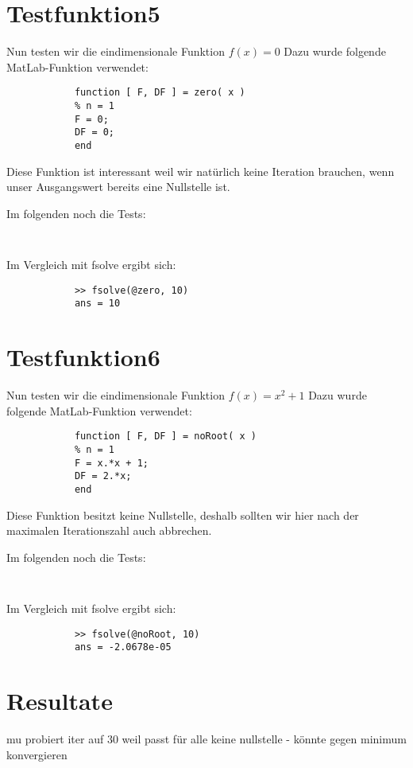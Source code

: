 \documentclass[11pt,titlepage]{article}
\begin{document}
	\section{Testfunktion5}
		Nun testen wir die eindimensionale Funktion $ f(x) = 0$
		Dazu wurde folgende MatLab-Funktion verwendet:
		\begin{lstlisting}
			function [ F, DF ] = zero( x )
			% n = 1
			F = 0;
			DF = 0;
			end
		\end{lstlisting}
		Diese Funktion ist interessant weil wir natürlich keine Iteration brauchen, wenn unser Ausgangswert bereits eine Nullstelle ist.
	
		Im folgenden noch die Tests:
		
		\begin{lstlisting}
			
		\end{lstlisting}
		
		Im Vergleich mit fsolve ergibt sich:
		
		\begin{lstlisting}
			>> fsolve(@zero, 10)
			ans = 10
		\end{lstlisting}
	
	\section{Testfunktion6}
		Nun testen wir die eindimensionale Funktion $ f(x) = x^2 + 1$
		Dazu wurde folgende MatLab-Funktion verwendet:
		\begin{lstlisting}
			function [ F, DF ] = noRoot( x )
			% n = 1
			F = x.*x + 1;
			DF = 2.*x;
			end
		\end{lstlisting}
		Diese Funktion besitzt keine Nullstelle, deshalb sollten wir hier nach der maximalen Iterationszahl auch abbrechen.
	
		Im folgenden noch die Tests:
		
		\begin{lstlisting}
			
		\end{lstlisting}
		
		Im Vergleich mit fsolve ergibt sich:
		
		\begin{lstlisting}
			>> fsolve(@noRoot, 10)
			ans = -2.0678e-05
		\end{lstlisting}
	
	

		
	\section{Resultate}
		 mu probiert
		 iter auf 30 weil passt für alle
		 keine nullstelle - könnte gegen minimum konvergieren
		
\end{document}
